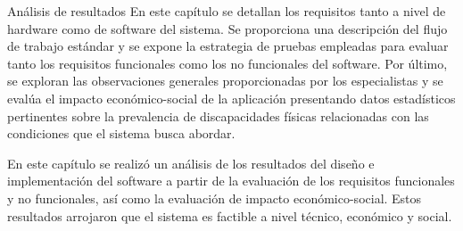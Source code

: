 \begin{thesischapter}{3} {Análisis de resultados}
En este capítulo se detallan los requisitos tanto a nivel de hardware como de software del sistema. Se proporciona una descripción del flujo de trabajo estándar y se expone la estrategia de pruebas empleadas para evaluar tanto los requisitos funcionales como los no funcionales del software. Por último, se exploran las observaciones generales proporcionadas por los especialistas y se evalúa el impacto económico-social de la aplicación presentando datos estadísticos pertinentes sobre la prevalencia de discapacidades físicas relacionadas con las condiciones que el sistema busca abordar.











En este capítulo se realizó un análisis de los resultados del diseño e implementación del software a partir de la  evaluación de los requisitos funcionales y no funcionales, así como la evaluación  de impacto económico-social. Estos resultados arrojaron que el sistema es factible a nivel técnico, económico y social.
\end{thesischapter}
